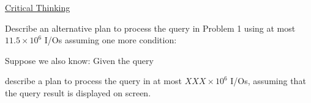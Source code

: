 \vgap

\begin{center}
    \uline{Critical Thinking}
\end{center}



 Describe an alternative plan to process the query in Problem 1 using at most $11.5 \times 10^6$ I/Os assuming one more condition:

%
%
%


 Suppose we also know:
Given the query



\noindent describe a plan to process the query in at most $XXX \times 10^6$ I/Os, assuming that the query result is displayed on screen.


